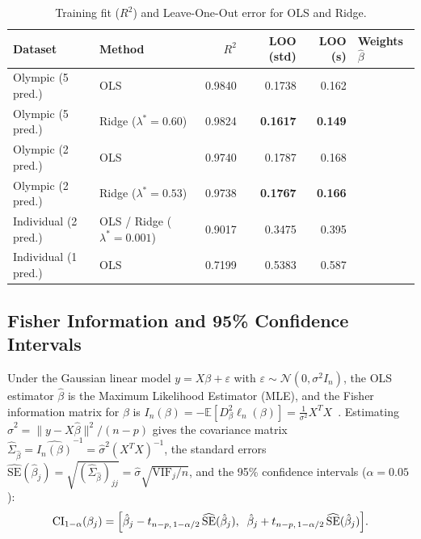 \documentclass[11pt, a4paper]{article}
\begin{document}
\begin{table}[H]
    \centering
    \footnotesize
    \renewcommand{\arraystretch}{1.25}
    \begin{tabularx}{\textwidth}{@{}l l r r r >{\raggedright\arraybackslash}X@{}}
        \toprule
        \textbf{Dataset} & \textbf{Method} & \textbf{$R^2$} & \textbf{LOO (std)} & \textbf{LOO (s)} & \textbf{Weights $\hat{\beta}$} \\
        \midrule
        Olympic (5 pred.) & OLS & 0.9840 & 0.1738 & 0.162 & [$0.474$, $0.283$, $-0.070$, $0.392$, $-0.077$] \\
        Olympic (5 pred.) & Ridge ($\lambda^*=0.60$) & 0.9824 & \textbf{0.1617} & \textbf{0.149} & [$0.317$, $0.172$, $0.016$, $0.341$, $0.151$] \\
        Olympic (2 pred.) & OLS & 0.9740 & 0.1787 & 0.168 & [$0.555$, $0.444$] \\
        Olympic (2 pred.) & Ridge ($\lambda^*=0.53$) & 0.9738 & \textbf{0.1767} & \textbf{0.166} & [$0.526$, $0.458$] \\
        Individual (2 pred.) & OLS / Ridge ($\lambda^*=0.001$) & 0.9017 & 0.3475 & 0.395 & [$0.048$, $0.908$] \\
        Individual (1 pred.) & OLS & 0.7199 & 0.5383 & 0.587 & [$0.848$] \\
        \bottomrule
    \end{tabularx}
    \caption{Training fit ($R^2$) and Leave-One-Out error for OLS and Ridge.}
    \label{tab:phase3_models}
\end{table}

\subsection{Fisher Information and 95\% Confidence Intervals}

Under the Gaussian linear model $y = X\beta + \varepsilon$ with $\varepsilon \sim \mathcal{N}(0, \sigma^2 I_n)$, the OLS estimator $\hat{\beta}$ is the Maximum Likelihood Estimator (MLE), and the Fisher information matrix for $\beta$ is $I_n(\beta) = -\mathbb{E}[D^2_\beta \ell_n(\beta)] = \frac{1}{\sigma^2} X^T X$~\cite{wasserman2004}. Estimating $\hat{\sigma}^2 = \|y - X\hat{\beta}\|^2 / (n - p)$ gives the covariance matrix $\widehat{\Sigma}_{\hat{\beta}} = \widehat{I_n(\beta)}^{-1} = \hat{\sigma}^2 (X^T X)^{-1}$, the standard errors $\widehat{\text{SE}}(\hat{\beta}_j) = \sqrt{(\widehat{\Sigma}_{\hat{\beta}})_{jj}} = \hat{\sigma}\sqrt{\text{VIF}_j / n}$, and the 95\% confidence intervals ($\alpha = 0.05$):
\begin{equation}
    \text{CI}_{1-\alpha}(\beta_j) = \Bigl[\hat{\beta}_j - t_{n-p,\, 1-\alpha/2}\,\widehat{\text{SE}}(\hat{\beta}_j),\;\; \hat{\beta}_j + t_{n-p,\, 1-\alpha/2}\,\widehat{\text{SE}}(\hat{\beta}_j)\Bigr].
\end{equation}
\end{document}
